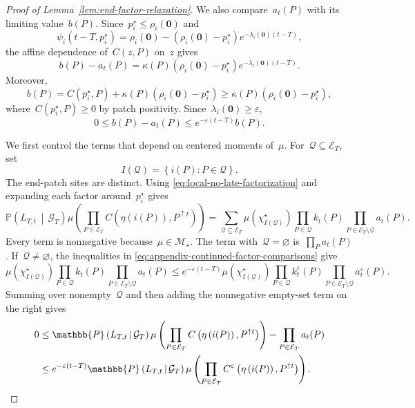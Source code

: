 \documentclass[EJP,preprint,NODS,nobera]{ejpecp}
\newcommand{\pP}{\mathbb{P}}
\newcommand{\CP}[2]{\pP\bb{#1\,\middle|\,#2}}
\newcommand{\bb}[1]{\left(#1\right)}
\newcommand{\cb}[1]{\left\{#1\right\}}
\newcommand{\mb}[1]{\mathbf{#1}}
\begin{document}
\begin{proof}[Proof of Lemma~\ref{lem:end-factor-relaxation}]
We also compare~$a_t(P)$ with its limiting value~$b(P)$. Since~$p_i^\star\leq\rho_i(\mb 0)$ and
\begin{equation*}
\psi_i(t-T,p_i^\star)
=
\rho_i(\mb 0)
-
\bb{\rho_i(\mb 0)-p_i^\star}
e^{-\lambda_i(\mb 0)(t-T)},
\end{equation*}
the affine dependence of~$C(z,P)$ on~$z$ gives
\begin{equation*}
b(P)-a_t(P)
=
\kappa(P)\bb{\rho_i(\mb 0)-p_i^\star}
e^{-\lambda_i(\mb 0)(t-T)}.
\end{equation*}
Moreover,
\begin{equation*}
b(P)
=
C\bb{p_i^\star,P}
+
\kappa(P)\bb{\rho_i(\mb 0)-p_i^\star}
\geq
\kappa(P)\bb{\rho_i(\mb 0)-p_i^\star},
\end{equation*}
where~$C(p_i^\star,P)\geq0$ by patch positivity. Since~$\lambda_i(\mb 0)\geq\varepsilon$,
\begin{equation}
\label{eq:continued-end-factor-limit-comparison}
0
\leq
b(P)-a_t(P)
\leq
e^{-\varepsilon(t-T)}b(P).
\end{equation}

We first control the terms that depend on centered moments of~$\mu$. For~$\mathcal Q\subseteq\mathcal E_T$, set
\begin{equation*}
I(\mathcal Q)
=
\cb{i(P):P\in\mathcal Q}.
\end{equation*}
The end-patch sites are distinct. Using
\eqref{eq:local-no-late-factorization} and expanding each factor around~$p_i^\star$ gives
\begin{equation}
\CP{L_{T,t}}{\mathcal G_T}
\mu\bb{
 \prod_{P\in\mathcal E_T}
 C\bb{\eta\bb{i(P)},P^{\uparrow t}}
}
=
\sum_{\mathcal Q\subseteq\mathcal E_T}
\mu\bb{\chi_{I(\mathcal Q)}^\star}
\prod_{P\in\mathcal Q}k_t(P)
\prod_{P\in\mathcal E_T\setminus\mathcal Q}a_t(P).
\label{eq:continued-end-factor-centered-expansion}
\end{equation}
Every term is nonnegative because~$\mu\in\mathcal M_\star$. The term with~$\mathcal Q=\varnothing$ is~$\prod_Pa_t(P)$. If~$\mathcal Q\neq\varnothing$, the inequalities in
\eqref{eq:appendix-continued-factor-comparisons} give
\begin{equation*}
\mu\bb{\chi_{I(\mathcal Q)}^\star}
\prod_{P\in\mathcal Q}k_t(P)
\prod_{P\in\mathcal E_T\setminus\mathcal Q}a_t(P)
\leq
e^{-\varepsilon(t-T)}
\mu\bb{\chi_{I(\mathcal Q)}^\star}
\prod_{P\in\mathcal Q}k_t^\varepsilon(P)
\prod_{P\in\mathcal E_T\setminus\mathcal Q}a_t^\varepsilon(P).
\end{equation*}
Summing over nonempty~$\mathcal Q$ and then adding the nonnegative empty-set
term on the right gives
\begin{align}
0
&\leq
\CP{L_{T,t}}{\mathcal G_T}
\mu\bb{
 \prod_{P\in\mathcal E_T}
 C\bb{\eta\bb{i(P)},P^{\uparrow t}}
}
-
\prod_{P\in\mathcal E_T}a_t(P)
\notag\\
&\leq
e^{-\varepsilon(t-T)}
\CP{L_{T,t}}{\mathcal G_T}
\mu\bb{
 \prod_{P\in\mathcal E_T}
 C^\varepsilon\bb{\eta\bb{i(P)},P^{\uparrow t}}
}.
\label{eq:continued-end-factor-centered-error}
\end{align}


\end{proof}
\end{document}
